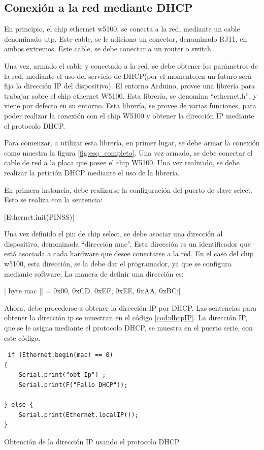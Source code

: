 \subsection{Conexión a la red mediante DHCP} 

En principio, el chip ethernet w5100, se conecta a la red, mediante un cable denominado utp. Este cable, se le adiciona un conector, denominado RJ11, en ambos extremos. Este cable, se debe conectar a un router o switch.   

 Una vez, armado el cable y conectado a la red, se debe obtener los parámetros de la red, mediante el uso del servicio de DHCP(por el momento,en un futuro será fija la dirección IP del dispositivo). El entorno Arduino, provee una librería para trabajar sobre el chip ethernet W5100. Esta librería, se denomina ``ethernet.h'', y viene por defecto en su entorno. Esta librería, se provee de varias funciones, para poder realizar la conexión con el chip W5100 y obtener la dirección IP mediante el protocolo DHCP. 
 
 Para comenzar, a utilizar esta librería, en primer lugar, se debe armar la conexión como muestra la figura \ref{fig:esq_completo}. Una vez armado, se debe conectar el cable de red a la placa que posee el chip W5100. Una vez realizado, se debe realizar la petición DHCP mediante el uso de la librería. 
 
  
En primera instancia, debe realizarse la configuración del puerto de slave select. Esto se realiza con la sentencia:  

|Ethernet.init(PINSS)| 

Una vez definido el pin de chip select, se debe asociar una dirección al dispositivo, denominada ``dirección mac''. Esta dirección es un identificador que está asociada a cada hardware que desee conectarse a la red. En el caso del chip w5100, esta dirección, se la debe dar el programador, ya que se configura mediante software. La manera de definir una dirección es: 

|  byte mac [] = {0x00, 0xCD, 0xEF, 0xEE, 0xAA, 0xBC};|  

Ahora, debe procederse a obtener la dirección IP por DHCP. Las sentencias para obtener la dirección ip se muestran en el código \ref{cod:dhcpIP}. La dirección IP, que se le asigna mediante el protocolo DHCP, se muestra en el puerto serie, con este código.

\begin{listing}[ht]
	\begin{verbatim}
 if (Ethernet.begin(mac) == 0)
{
	Serial.print("obt_Ip") ;
	Serial.print(F("Fallo DHCP"));
	
} else {
	Serial.print(Ethernet.localIP());
}		
	\end{verbatim}
\caption{Obtención de la dirección IP usando el protocolo DHCP} 	
\label{cod:dhcpIP} 
\end{listing}


